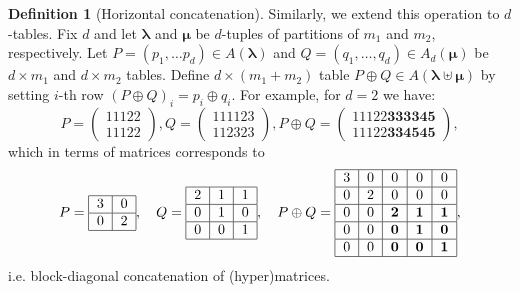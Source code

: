 \documentclass[12pt, reqno]{amsart}
\theoremstyle{definition}
\newtheorem{definition}[theorem]{Definition}
\begin{document}
\begin{definition}[Horizontal concatenation]
    Similarly, we extend this operation to $d$-tables. Fix $d$ and let $\pmb{\lambda}$ and $\pmb{\mu}$ be $d$-tuples of partitions of $m_1$ and $m_2$, respectively. Let $P = (p_1,\ldots p_d) \in A(\pmb{\lambda})$ and $Q = (q_1,\ldots,q_d) \in A_d(\pmb{\mu})$ be $d \times m_1$ and $d \times m_2$ tables. Define $d \times (m_1 + m_2)$ table $P \oplus Q \in A(\pmb{\lambda} \uplus \pmb{\mu})$ by setting $i$-th row $(P \oplus Q)_i = p_i \oplus q_i$. For example, for $d = 2$ we have:
    $$
        P = \begin{pmatrix}
            11122\\
            11122
        \end{pmatrix}, 
        Q = \begin{pmatrix}
            111123\\
            112323
        \end{pmatrix},
        P \oplus Q = \begin{pmatrix}
            11122\textbf{333345}\\
            11122\textbf{334545}
        \end{pmatrix},
    $$
    which in terms of matrices corresponds to
    $$
    P = \begin{tabular}{ | c | c | } 
        \hline
        3 & 0 \\ 
        \hline
        0 & 2 \\
        \hline
    \end{tabular}, \quad
    Q = \begin{tabular}{ | c | c| c | } 
        \hline
        2 & 1 & 1 \\ 
        \hline
        0 & 1 & 0 \\
        \hline
        0 & 0 & 1 \\
        \hline
    \end{tabular}, \quad
    P \oplus Q = \begin{tabular}{ |c|c|c|c|c| } 
        \hline
        3 & 0 & 0 & 0 & 0\\
        \hline
        0 & 2 & 0 & 0 & 0\\
        \hline
        0 & 0 & \bf{2} & \bf{1} & \bf{1} \\ 
        \hline
        0 & 0 & \bf{0} & \bf{1} & \bf{0} \\
        \hline
        0 & 0 & \bf{0} & \bf{0} & \bf{1} \\
        \hline
    \end{tabular},
    $$
    i.e. block-diagonal concatenation of (hyper)matrices.
\end{definition}
\end{document}
